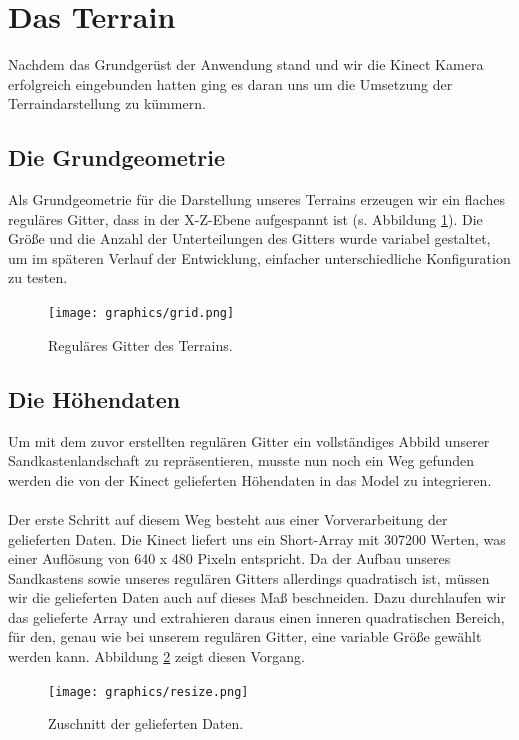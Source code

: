 \section{Das Terrain}
\begin{Spacing}{\mylinespace}

Nachdem das Grundgerüst der Anwendung stand und wir die Kinect Kamera erfolgreich eingebunden hatten ging es daran uns um die Umsetzung der Terraindarstellung zu kümmern.

\subsection{Die Grundgeometrie}
Als Grundgeometrie für die Darstellung unseres Terrains erzeugen wir ein flaches reguläres Gitter, dass in der X-Z-Ebene aufgespannt ist (s. Abbildung \ref{fig:grid}). Die Größe und die Anzahl der Unterteilungen des Gitters wurde variabel gestaltet, um im späteren Verlauf der Entwicklung, einfacher unterschiedliche Konfiguration zu testen. 

\begin{figure}[h!]
	\centering
	\vspace*{10px}
	\texttt{[image: graphics/grid.png]}
	\caption{Reguläres Gitter des Terrains.}
	\label{fig:grid}
\end{figure}

\subsection{Die Höhendaten}
Um mit dem zuvor erstellten regulären Gitter ein vollständiges Abbild unserer Sandkastenlandschaft zu repräsentieren, musste nun noch ein Weg gefunden werden die von der Kinect gelieferten Höhendaten in das Model zu integrieren.
\\\\
Der erste Schritt auf diesem Weg besteht aus einer Vorverarbeitung der gelieferten Daten. Die Kinect liefert uns ein Short-Array mit 307200 Werten, was einer Auflösung von 640 x 480 Pixeln entspricht. Da der Aufbau unseres Sandkastens sowie unseres regulären Gitters allerdings quadratisch ist, müssen wir die gelieferten Daten auch auf dieses Maß beschneiden. Dazu durchlaufen wir das gelieferte Array und extrahieren daraus einen inneren quadratischen Bereich, für den, genau wie bei unserem regulären Gitter, eine variable Größe gewählt werden kann. Abbildung \ref{fig:resize} zeigt diesen Vorgang.     
\\
\begin{figure}[h!]
	\centering
	\texttt{[image: graphics/resize.png]}
	\caption{Zuschnitt der gelieferten Daten.}
	\label{fig:resize}
\end{figure}  


\end{Spacing}
